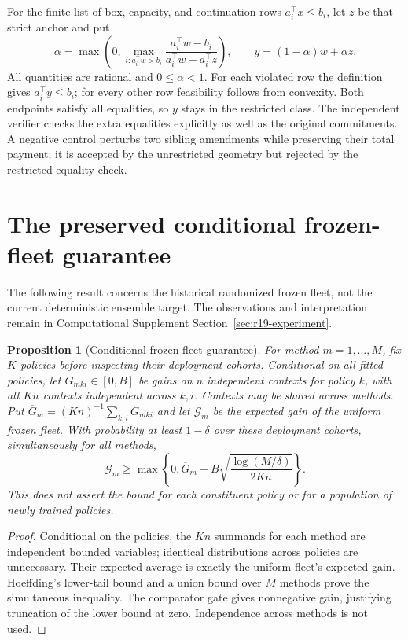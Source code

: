 \documentclass[11pt,letterpaper]{article}
\newtheorem{proposition}[theorem]{Proposition}
\theoremstyle{definition}
\newcommand{\1}{\mathbf 1}
\begin{document}
For the finite list of box, capacity, and continuation rows $a_i^\top x\leq b_i$, let $z$ be that strict anchor and put
\[
 \alpha=\max\left(0,\max_{i:a_i^\top w>b_i}
 \frac{a_i^\top w-b_i}{a_i^\top w-a_i^\top z}\right),\qquad
 y=(1-\alpha)w+\alpha z.
\]
All quantities are rational and $0\leq\alpha<1$. For each violated row the definition gives $a_i^\top y\leq b_i$; for every other row feasibility follows from convexity. Both endpoints satisfy all equalities, so $y$ stays in the restricted class. The independent verifier checks the extra equalities explicitly as well as the original commitments. A negative control perturbs two sibling amendments while preserving their total payment; it is accepted by the unrestricted geometry but rejected by the restricted equality check.

\section{The preserved conditional frozen-fleet guarantee}\label{ec:r24-fleet}
The following result concerns the historical randomized frozen fleet, not the current deterministic ensemble target. The observations and interpretation remain in Computational Supplement Section~\ref{sec:r19-experiment}.
\begin{proposition}[Conditional frozen-fleet guarantee]\label{prop:r19-fleet}
For method $m=1,\ldots,M$, fix $K$ policies before inspecting their deployment cohorts. Conditional on all fitted policies, let $G_{mki}\in[0,B]$ be gains on $n$ independent contexts for policy $k$, with all $Kn$ contexts independent across $k,i$. Contexts may be shared across methods. Put $\overline G_m=(Kn)^{-1}\sum_{k,i}G_{mki}$ and let $\mathcal G_m$ be the expected gain of the uniform frozen fleet. With probability at least $1-\delta$ over these deployment cohorts, simultaneously for all methods,
\begin{equation}\label{eq:r19-fleet}
 \mathcal G_m\geq\max\left\{0,\overline G_m-
 B\sqrt{\frac{\log(M/\delta)}{2Kn}}\right\}.
\end{equation}
This does not assert the bound for each constituent policy or for a population of newly trained policies.
\end{proposition}
\begin{proof}
Conditional on the policies, the $Kn$ summands for each method are independent bounded variables; identical distributions across policies are unnecessary. Their expected average is exactly the uniform fleet's expected gain. Hoeffding's lower-tail bound and a union bound over $M$ methods prove the simultaneous inequality. The comparator gate gives nonnegative gain, justifying truncation of the lower bound at zero. Independence across methods is not used.
\end{proof}
\end{document}
